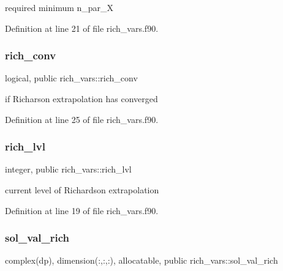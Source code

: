 required minimum {\ttfamily n\+\_\+par\+\_\+X} 



Definition at line 21 of file rich\+\_\+vars.\+f90.

\mbox{\label{namespacerich__vars_adf63efd509bbcda4f77fd7e88c766081}} 
\subsubsection{\texorpdfstring{rich\+\_\+conv}{rich\_conv}}
{\footnotesize\ttfamily logical, public rich\+\_\+vars\+::rich\+\_\+conv}



if Richarson extrapolation has converged 



Definition at line 25 of file rich\+\_\+vars.\+f90.

\mbox{\label{namespacerich__vars_a1b7734ba9ce6cc153b22387e638093c0}} 
\subsubsection{\texorpdfstring{rich\+\_\+lvl}{rich\_lvl}}
{\footnotesize\ttfamily integer, public rich\+\_\+vars\+::rich\+\_\+lvl}



current level of Richardson extrapolation 



Definition at line 19 of file rich\+\_\+vars.\+f90.

\mbox{\label{namespacerich__vars_ae1d3c7deb4c8becd036a63367fca5e20}} 
\subsubsection{\texorpdfstring{sol\+\_\+val\+\_\+rich}{sol\_val\_rich}}
{\footnotesize\ttfamily complex(dp), dimension(\+:,\+:,\+:), allocatable, public rich\+\_\+vars\+::sol\+\_\+val\+\_\+rich}




